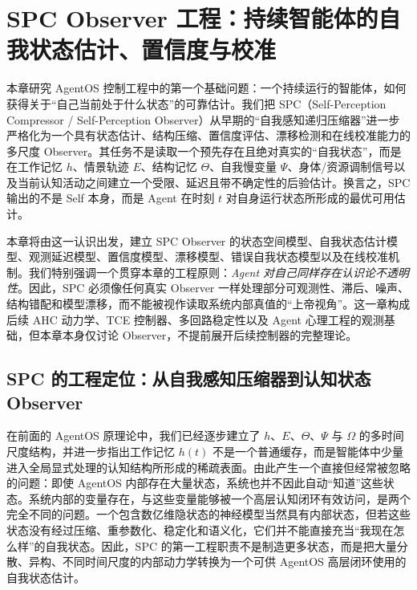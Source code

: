 \chapter{SPC Observer 工程：持续智能体的自我状态估计、置信度与校准}
\label{chap:spc-observer-engineering}

\begin{chapterlead}
本章研究 AgentOS 控制工程中的第一个基础问题：一个持续运行的智能体，如何获得关于“自己当前处于什么状态”的可靠估计。我们把 SPC（Self-Perception Compressor / Self-Perception Observer）从早期的“自我感知递归压缩器”进一步严格化为一个具有状态估计、结构压缩、置信度评估、漂移检测和在线校准能力的多尺度 Observer。其任务不是读取一个预先存在且绝对真实的“自我状态”，而是在工作记忆 $h$、情景轨迹 $E$、结构记忆 $\Theta$、自我慢变量 $\Psi$、身体/资源调制信号以及当前认知活动之间建立一个受限、延迟且带不确定性的后验估计。换言之，SPC 输出的不是 Self 本身，而是 Agent 在时刻 $t$ 对自身运行状态所形成的最优可用估计。

本章将由这一认识出发，建立 SPC Observer 的状态空间模型、自我状态估计模型、观测延迟模型、置信度模型、漂移模型、错误自我状态模型以及在线校准机制。我们特别强调一个贯穿本章的工程原则：\emph{Agent 对自己同样存在认识论不透明性}。因此，SPC 必须像任何真实 Observer 一样处理部分可观测性、滞后、噪声、结构错配和模型漂移，而不能被视作读取系统内部真值的“上帝视角”。这一章构成后续 AHC 动力学、TCE 控制器、多回路稳定性以及 Agent 心理工程的观测基础，但本章本身仅讨论 Observer，不提前展开后续控制器的完整理论。
\end{chapterlead}

\section{SPC 的工程定位：从自我感知压缩器到认知状态 Observer}
\label{sec:spc-observer-position}

在前面的 AgentOS 原理论中，我们已经逐步建立了 $h$、$E$、$\Theta$、$\Psi$ 与 $\Omega$ 的多时间尺度结构，并进一步指出工作记忆 $h(t)$ 不是一个普通缓存，而是智能体中少量进入全局显式处理的认知结构所形成的稀疏表面。由此产生一个直接但经常被忽略的问题：即使 AgentOS 内部存在大量状态，系统也并不因此自动“知道”这些状态。系统内部的变量存在，与这些变量能够被一个高层认知闭环有效访问，是两个完全不同的问题。一个包含数亿维隐状态的神经模型当然具有内部状态，但若这些状态没有经过压缩、重参数化、稳定化和语义化，它们并不能直接充当“我现在怎么样”的自我状态。因此，SPC 的第一工程职责不是制造更多状态，而是把大量分散、异构、不同时间尺度的内部动力学转换为一个可供 AgentOS 高层闭环使用的自我状态估计。

